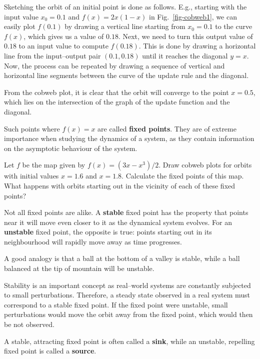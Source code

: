 Sketching the orbit of an initial point is done as follows. E.g., starting with the input value $x_0=0.1$ and $f(x)=2x(1-x)$ in Fig.~\ref{fig-cobweb1}, we can easily plot $f(0.1)$ by drawing a vertical line starting from $x_0=0.1$ to the curve $f(x)$, which gives us a value of $0.18$. Next, we need to turn this output value of $0.18$ to an input value to compute $f(0.18)$. This is done by drawing a horizontal line from the input--output pair $(0.1,0.18)$ until it reaches the diagonal $y=x$. Now, the process can be repeated by drawing a sequence of vertical and horizontal line segments between the curve of the update rule and the diagonal.

From the cobweb plot, it is clear that the orbit will converge to the point $x=0.5$, which lies on the intersection of the graph of the update function and the diagonal.

Such points where $f(x)=x$ are called \textbf{fixed points}. They are of extreme importance when studying the dynamics of a system, as they contain information on the asymptotic behaviour of the system.


\begin{exer}
Let $f$ be the map given by $f(x) = (3x-x^3)/2$. Draw cobweb plots for orbits with initial values $x=1.6$ and $x=1.8$. Calculate the fixed points of this map. What happens with orbits starting out in the vicinity of each of these fixed points?
\end{exer}

\pagebreak


Not all fixed points are alike. A \textbf{stable} fixed point has the property that points near it will move even closer to it as the dynamical system evolves. For an \textbf{unstable} fixed point, the opposite is true: points starting out in its neighbourhood will rapidly move away as time progresses.

A good analogy is that a ball at the bottom of a valley is stable, while a ball balanced at the tip of mountain will be unstable.

Stability is an important concept as real--world systems are constantly subjected to small perturbations. Therefore, a steady state observed in a real system must correspond to a stable fixed point. If the fixed point were unstable, small perturbations would move the orbit away from the fixed point, which would then be not observed.

A stable, attracting fixed point is often called a \textbf{sink}, while an unstable, repelling fixed point is called a \textbf{source}.

